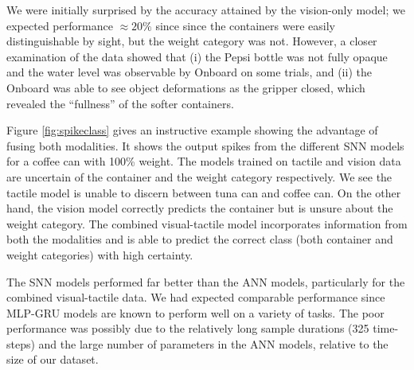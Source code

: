 \documentclass[fyp]{socreport}
\begin{document}
We were initially surprised by the accuracy attained by the vision-only model;
we expected performance $\approx 20\%$ since since the containers were easily
distinguishable by sight, but the weight category was not. However, a closer
examination of the data showed that (i) the Pepsi bottle was not fully opaque
and the water level was observable by Onboard on some trials, and (ii) the
Onboard was able to see object deformations as the gripper closed, which
revealed the ``fullness'' of the softer containers.

Figure \ref{fig:spikeclass} gives an instructive example showing the advantage
of fusing both modalities. It shows the output spikes from the different SNN
models for a coffee can with 100\% weight. The models trained on tactile and
vision data are uncertain of the container and the weight category respectively.
We see the tactile model is unable to discern between tuna can and coffee can.
On the other hand, the vision model correctly predicts the container but is
unsure about the weight category. The combined visual-tactile model incorporates
information from both the modalities and is able to predict the correct class
(both container and weight categories) with high certainty.

The SNN models performed far better than the ANN models, particularly for the
combined visual-tactile data. We had expected comparable performance since
MLP-GRU models are known to perform well on a variety of tasks. The poor
performance was possibly due to the relatively long sample durations (325
time-steps) and the large number of parameters in the ANN models, relative to
the size of our dataset.
\end{document}
